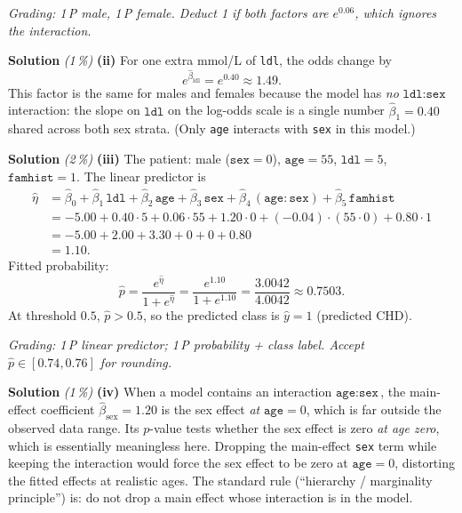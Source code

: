 \documentclass[11pt,a4paper]{article}
\newcommand{\subpoints}[1]{\textit{(#1\,\%)}}
\newcommand{\sol}{\noindent\textbf{Solution}}
\begin{document}
\noindent\emph{Grading: 1\,P male, 1\,P female. Deduct 1 if both factors are $e^{0.06}$, which ignores
the interaction.}

\medskip
\sol{} \subpoints{1} \textbf{(ii)} For one extra mmol/L of \texttt{ldl}, the odds change by
$$e^{\hat\beta_{\text{ldl}}} = e^{0.40} \approx \boxed{1.49}.$$
This factor is the same for males and females because the model has \emph{no} $\texttt{ldl}\!:\!\texttt{sex}$
interaction: the slope on $\texttt{ldl}$ on the log-odds scale is a single number $\hat\beta_1=0.40$ shared
across both sex strata. (Only \texttt{age} interacts with \texttt{sex} in this model.)

\medskip
\sol{} \subpoints{2} \textbf{(iii)} The patient: male ($\texttt{sex}=0$), $\texttt{age}=55$,
$\texttt{ldl}=5$, $\texttt{famhist}=1$. The linear predictor is
\begin{align*}
\hat\eta &= \hat\beta_0 + \hat\beta_1\,\texttt{ldl} + \hat\beta_2\,\texttt{age}
          + \hat\beta_3\,\texttt{sex} + \hat\beta_4\,(\texttt{age}\!:\!\texttt{sex})
          + \hat\beta_5\,\texttt{famhist} \\
   &= -5.00 + 0.40\cdot 5 + 0.06\cdot 55 + 1.20\cdot 0 + (-0.04)\cdot(55\cdot 0) + 0.80\cdot 1 \\
   &= -5.00 + 2.00 + 3.30 + 0 + 0 + 0.80 \\
   &= \boxed{1.10}.
\end{align*}
Fitted probability:
$$\hat p = \frac{e^{\hat\eta}}{1 + e^{\hat\eta}}
        = \frac{e^{1.10}}{1 + e^{1.10}}
        = \frac{3.0042}{4.0042}
        \approx \boxed{0.7503}.$$
At threshold $0.5$, $\hat p > 0.5$, so the predicted class is $\boxed{\hat y = 1}$ (predicted CHD).

\noindent\emph{Grading: 1\,P linear predictor; 1\,P probability + class label. Accept $\hat p\in[0.74,0.76]$
for rounding.}

\medskip
\sol{} \subpoints{1} \textbf{(iv)} When a model contains an interaction $\texttt{age}\!:\!\texttt{sex}$, the
main-effect coefficient $\hat\beta_{\text{sex}}=1.20$ is the sex effect \emph{at} $\texttt{age}=0$, which is
far outside the observed data range. Its $p$-value tests whether the sex effect is zero \emph{at age zero},
which is essentially meaningless here. Dropping the main-effect \texttt{sex} term while keeping the
interaction would force the sex effect to be zero at $\texttt{age}=0$, distorting the fitted effects at
realistic ages. The standard rule (``hierarchy / marginality principle'') is: do not drop a main effect
whose interaction is in the model.
\end{document}
